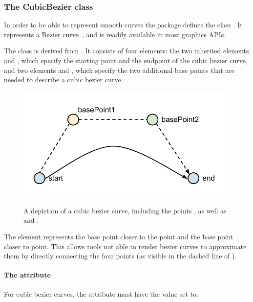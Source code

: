 \begin{center}
\end{center}

\subsubsection{The CubicBezier class}
\label{cubicbezier-class}
In order to be able to represent smooth curves the \Layout package 
defines the class \CubicBezier. It represents a Bezier curve~\citep{beziercurve}, 
and is readily available in most graphics APIs. 

The class \CubicBezier is derived from \LineSegment. It consists of 
four elements: the two inherited elements  and , 
which specify the starting point and the endpoint of the cubic bezier curve, 
and two elements  and , which specify the 
two additional base points that are needed to describe a cubic bezier curve. 

\begin{figure}[!ht]
\includegraphics{figures/layout-cubic-bezier}\\
\caption{A depiction of a cubic bezier curve, including the points
  ,  as well as  and .} 
\label{figure:cubic-bezier}
\end{figure}

The  element represents the base point closer to the 
 point and  the base point closer to 
 point. This allows tools not able to render bezier curves to 
approximate them by directly connecting the four points (as visible in 
the dashed line of ). 


\paragraph {The  attribute} For cubic bezier curves, the 
attribute  must have the value set to: 


